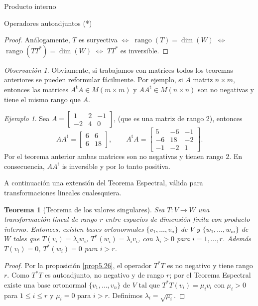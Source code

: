 \documentclass[a4paper,12pt,twoside,spanish,reqno]{amsbook}
\numberwithin{equation}{section}
\newtheorem{teorema}{Teorema}[section]
\theoremstyle{definition}
\theoremstyle{remark}
\newtheorem*{ejemplo*}{Ejemplo}
\newtheorem*{obs*}{Observaci\'on}
\renewcommand{\t}{{\operatorname{t}}}
\begin{document}
\begin{chapter}{Producto interno}
\begin{section}{Operadores autoadjuntos (*)}
\begin{proof}
            Análogamente, $T$ es suryectiva   $\Leftrightarrow$  $\operatorname{rango}(T) = \dim(W)$ $\Leftrightarrow$ $\operatorname{rango}(TT^*) = \dim(W)$   $\Leftrightarrow$  $TT^*$  es inversible.
        \end{proof}
        
        \begin{obs*}
            Obviamente, si trabajamos con matrices todos  los teoremas anteriores se pueden reformular fácilmente. Por  ejemplo, si $A$ matriz $n \times m$, entonces  las  matrices $A^{\t}A \in M(m \times m)$ y $AA^{\t} \in M(n \times n)$ son  no negativas y tiene el mismo rango que $A$. 
        \end{obs*}
        
        \begin{ejemplo*}
            Sea $A = \begin{bmatrix}
            1&2&-1 \\
            -2& 4&0
            \end{bmatrix}$, (que es una matriz de rango 2), entonces
            $$
            AA^{\t} = \begin{bmatrix}
            6&6\\6&18
            \end{bmatrix}, \qquad 
            A^{\t}A = \begin{bmatrix}
            5&-6&-1\\-6&18&-2\\ -1&-2&1
            \end{bmatrix}.
            $$
            Por el  teorema  anterior ambas matrices son no negativas y tienen rango 2. En  consecuencia, $AA^{\t}$ is inversible y  por lo tanto positiva.
        \end{ejemplo*}
        
        A continuación una extensión del Teorema Espectral, válida para transformaciones lineales cualesquiera.
        
        \begin{teorema}[Teorema de los valores singulares]
            Sea $T: V \to W$ una transformación lineal de rango $r$ entre espacios de dimensión finita 	con producto interno. Entonces, existen bases ortonormales $\{v_1,\ldots,v_n\}$ de $V$ y $\{w_1,\ldots,w_m\}$ de $W$ tales que $T(v_i) = \lambda_i w_i$,  $T^*(w_i) = \lambda_i v_i$, con $\lambda_i >0$ para $i=1,\ldots,r$. Además $T(v_i) = 0$,  $T^*(w_i) = 0$ para $i > r$. 
        \end{teorema}
        \begin{proof}
            Por la  proposición  \ref{prop5.26},  el operador $T^*T$ es no negativo y tiene rango  $r$. Como  $T^*T$  es autoadjunto, no negativo y  de rango  $r$; por el Teorema Espectral existe una base ortonormal $\{v_1,\ldots,v_n\}$ de $V$ tal que $T^*T(v_i) = \mu_i v_i$ con $\mu_i >0$ para $1 \le i \le r$ y  $\mu_i = 0$ para $i>r$. Definimos $\lambda_i = \sqrt{\mu_i}$. 
            

\end{proof}
\end{section}
\end{chapter}
\end{document}

